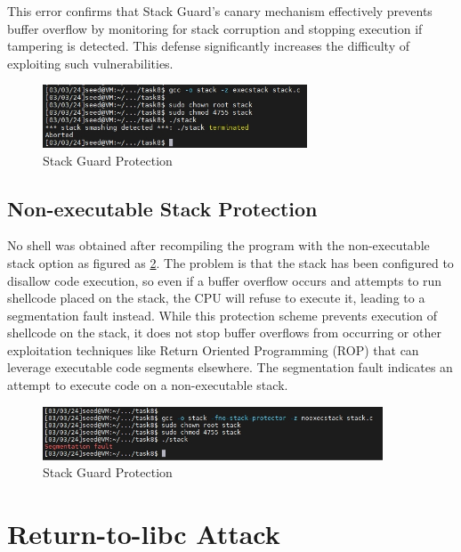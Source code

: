 \documentclass[a4paper,11pt]{article}
\begin{document}
This error confirms that Stack Guard's canary mechanism effectively prevents buffer overflow by monitoring for stack corruption and stopping execution if tampering is detected. This defense significantly increases the difficulty of exploiting such vulnerabilities.

\begin{figure}[h]
    \centering
       \includegraphics[width=0.7\textwidth]{figures/task13/task13.png}
    \caption{Stack Guard Protection}\label{fig:task13}
\end{figure}

\subsection{Non-executable Stack Protection}
No shell was obtained after recompiling the program with the non-executable stack option as figured as \ref{fig:task14}. The problem is that the stack has been configured to disallow code execution, so even if a buffer overflow occurs and attempts to run shellcode placed on the stack, the CPU will refuse to execute it, leading to a segmentation fault instead. While this protection scheme prevents execution of shellcode on the stack, it does not stop buffer overflows from occurring or other exploitation techniques like Return Oriented Programming (ROP) that can leverage executable code segments elsewhere. The segmentation fault indicates an attempt to execute code on a non-executable stack.
\begin{figure}[h]
    \centering
       \includegraphics[width=0.9\textwidth]{figures/task14/task14.png}
    \caption{Stack Guard Protection}\label{fig:task14}
\end{figure}

\section{Return-to-libc Attack}
\end{document}
